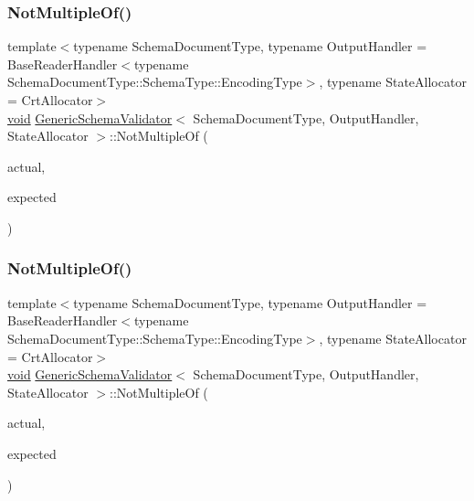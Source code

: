 \subsubsection{\texorpdfstring{Not\+Multiple\+Of()}{NotMultipleOf()}\hspace{0.1cm}{\footnotesize\ttfamily [2/3]}}
{\footnotesize\ttfamily template$<$typename Schema\+Document\+Type, typename Output\+Handler = Base\+Reader\+Handler$<$typename Schema\+Document\+Type\+::\+Schema\+Type\+::\+Encoding\+Type$>$, typename State\+Allocator = Crt\+Allocator$>$ \\
\hyperlink{imgui__impl__opengl3__loader_8h_ac668e7cffd9e2e9cfee428b9b2f34fa7}{void} \hyperlink{classGenericSchemaValidator}{Generic\+Schema\+Validator}$<$ Schema\+Document\+Type, Output\+Handler, State\+Allocator $>$\+::Not\+Multiple\+Of (\begin{DoxyParamCaption}\item[{\hyperlink{stdint_8h_aec6fcb673ff035718c238c8c9d544c47}{uint64\+\_\+t}}]{actual,  }\item[{const \hyperlink{classGenericSchemaValidator_a3c004e35c7eb9fa5a28c0ccfb8ac62dc}{S\+Value} \&}]{expected }\end{DoxyParamCaption})\hspace{0.3cm}{\ttfamily [inline]}}

\mbox{\label{classGenericSchemaValidator_ae5fc8a4545fed53955ec6c57b79ca949}} 
\subsubsection{\texorpdfstring{Not\+Multiple\+Of()}{NotMultipleOf()}\hspace{0.1cm}{\footnotesize\ttfamily [3/3]}}
{\footnotesize\ttfamily template$<$typename Schema\+Document\+Type, typename Output\+Handler = Base\+Reader\+Handler$<$typename Schema\+Document\+Type\+::\+Schema\+Type\+::\+Encoding\+Type$>$, typename State\+Allocator = Crt\+Allocator$>$ \\
\hyperlink{imgui__impl__opengl3__loader_8h_ac668e7cffd9e2e9cfee428b9b2f34fa7}{void} \hyperlink{classGenericSchemaValidator}{Generic\+Schema\+Validator}$<$ Schema\+Document\+Type, Output\+Handler, State\+Allocator $>$\+::Not\+Multiple\+Of (\begin{DoxyParamCaption}\item[{double}]{actual,  }\item[{const \hyperlink{classGenericSchemaValidator_a3c004e35c7eb9fa5a28c0ccfb8ac62dc}{S\+Value} \&}]{expected }\end{DoxyParamCaption})\hspace{0.3cm}{\ttfamily [inline]}}

